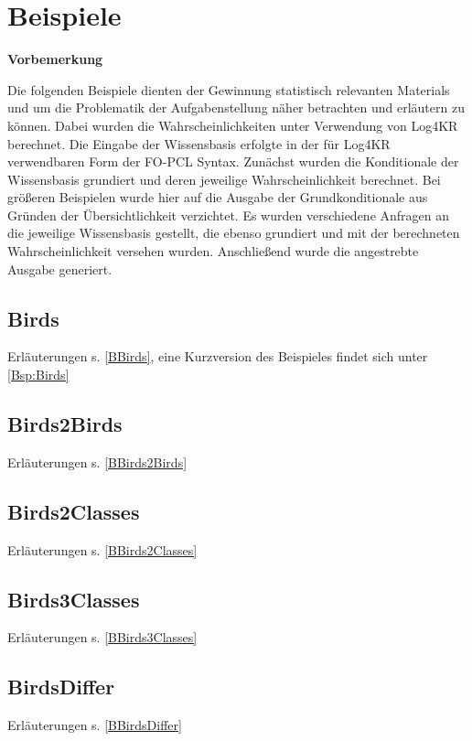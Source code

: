 \documentclass[a4paper, 11pt]{book}
\begin{document}
{\chapter{Beispiele}
\label{examples}

\textbf{Vorbemerkung}

\noindent
Die folgenden Beispiele dienten der Gewinnung statistisch relevanten Materials und um die Problematik der Aufgabenstellung näher betrachten und erläutern zu können. Dabei wurden die Wahrscheinlichkeiten unter Verwendung von Log4KR berechnet. Die Eingabe der Wissensbasis erfolgte in der für Log4KR verwendbaren Form der FO-PCL Syntax. Zunächst wurden die Konditionale der Wissensbasis grundiert und deren jeweilige Wahrscheinlichkeit berechnet. Bei größeren Beispielen wurde hier auf die Ausgabe der Grundkonditionale aus Gründen der Übersichtlichkeit verzichtet.
Es wurden verschiedene Anfragen an die jeweilige Wissensbasis gestellt, die ebenso grundiert und mit der berechneten Wahrscheinlichkeit versehen wurden.
Anschließend wurde die angestrebte Ausgabe  generiert. 

\section{Birds} Erläuterungen s. \ref{BBirds}, eine Kurzversion des Beispieles findet sich unter \ref{Bsp:Birds}
\label{Birds}

\newpage

\section{Birds2Birds} Erläuterungen s. \ref{BBirds2Birds}
\label{Birds2Birds}

\newpage

\section{Birds2Classes} Erläuterungen s. \ref{BBirds2Classes}
\label{Birds2Classes}

\newpage

\section{Birds3Classes} Erläuterungen s. \ref{BBirds3Classes}
\label{Birds3Classes}

\newpage

\section{BirdsDiffer} Erläuterungen s. \ref{BBirdsDiffer}
\label{BirdsDiffer}

\newpage

}
\end{document}

